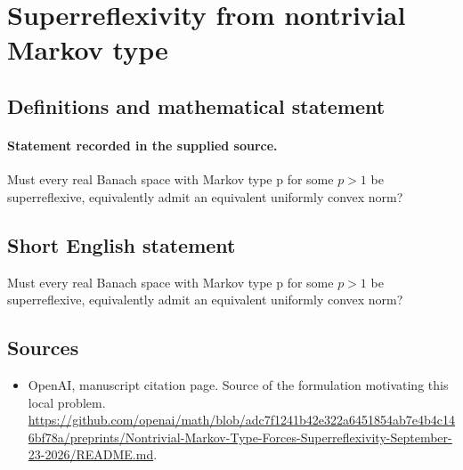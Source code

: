 \documentclass[11pt]{article}
\begin{document}
\section*{Superreflexivity from nontrivial Markov type}\label{30007181}
\subsection{Definitions and mathematical statement}
\paragraph{Statement recorded in the supplied source.}
Must every real Banach space with Markov type p for some $p>1$ be superreflexive, equivalently admit an equivalent uniformly convex norm?
\subsection{Short English statement}
Must every real Banach space with Markov type p for some $p>1$ be superreflexive, equivalently admit an equivalent uniformly convex norm?
\subsection{Sources}
\begin{itemize}
\item[S1] OpenAI, manuscript citation page. Source of the formulation motivating this local problem.
\url{https://github.com/openai/math/blob/adc7f1241b42e322a6451854ab7e4b4c146bf78a/preprints/Nontrivial-Markov-Type-Forces-Superreflexivity-September-23-2026/README.md}.
\end{itemize}
\end{document}
